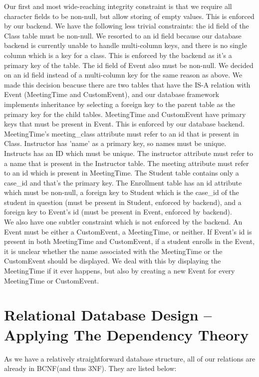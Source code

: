 \documentclass[pdftex,12pt,letter]{article}
\begin{document}
Our first and most wide-reaching integrity constraint is that we require all character fields to be non-null, but allow storing of empty values.  This is enforced by our backend.
We have the following less trivial constraints:  the id field of the Class table must be non-null.  We resorted to an id field because our database backend is currently unable to handle multi-column keys, and there is no single column which is a key for a class.  This is enforced by the backend as it's a primary key of the table.  
The id field of Event also must be non-null.  We decided on an id field instead of a multi-column key for the same reason as above.  We made this decision beacuse there are two tables that have the IS-A relation with Event (MeetingTime and CustomEvent), and our database framework implements inheritance by selecting a foreign key to the parent table as the primary key for the child tables.
MeetingTime and CustomEvent have primary keys that must be present in Event.  This is enforced by our database backend.  MeetingTime's meeting\_class attribute must refer to an id that is present in Class.
Instructor has 'name' as a primary key, so names must be unique.
Instructs has an ID which must be unique.  The instructor attribute must refer to a name that is present in the Instructor table.  The meeting attribute must refer to an id which is present in MeetingTime.
The Student table contains only a case\_id and that's the primary key.  The Enrollment table has an id attribute which must be non-null, a foreign key to Student which is the case\_id of the student in question (must be present in Student, enforced by backend), and a foreign key to Event's id (must be present in Event, enforced by backend).\\

We also have one subtler constraint which is not enforced by the backend.  An Event must be either a CustomEvent, a MeetingTime, or neither.  If Event's id is present in both MeetingTime and CustomEvent, if a student enrolls in the Event, it is unclear whether the name associated with the MeetingTime or the CustomEvent should be displayed.  We deal with this by displaying the MeetingTime if it ever happens, but also by creating a new Event for every MeetingTime or CustomEvent.\\

\section{Relational Database Design -- Applying The Dependency Theory}
As we have a relatively straightforward database structure, all of our relations are already in BCNF(and thus 3NF). They are listed below:
\end{document}
